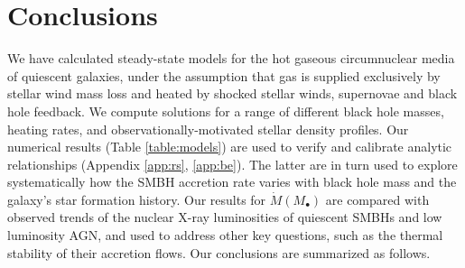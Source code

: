 \documentclass[usenatbib,fleqn]{mn2e}
\newcommand{\Mbh}[1][]{M_{\bullet#1}}
\begin{document}



\section{Conclusions}
\label{sec:conclusions}

We have calculated steady-state models for the hot gaseous circumnuclear media of quiescent galaxies, under the assumption that gas is supplied exclusively by stellar wind mass loss and heated by shocked stellar winds, supernovae and black hole feedback.  We compute solutions for a range of different black hole masses, heating rates, and observationally-motivated stellar density profiles.  Our numerical results (Table \ref{table:models}) are used to verify and calibrate analytic relationships (Appendix \ref{app:rs}, \ref{app:be}).  The latter are in turn used to explore systematically how the SMBH accretion rate varies with black hole mass and the galaxy's star formation history.  Our results for $\dot{M}(\Mbh)$ are compared with observed trends of the nuclear X-ray luminosities of quiescent SMBHs and low luminosity AGN, and used to address other key questions, such as the thermal stability of their accretion flows.  Our conclusions are summarized as follows.
\end{document}
